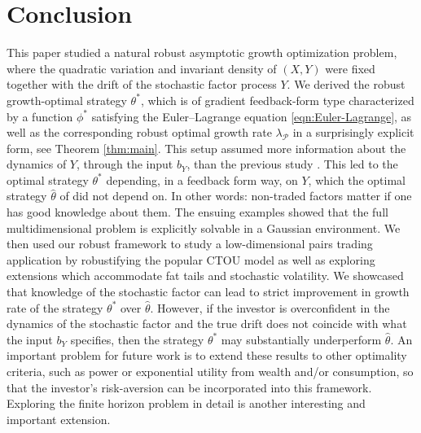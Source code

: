 \documentclass{article}
\theoremstyle{plain}
\theoremstyle{definition}
\newcommand{\Pcal}{{\mathcal P}}
\numberwithin{lem}{section}
\begin{document}
\section{Conclusion}
\label{sec:conclusion}
This paper studied a natural robust asymptotic growth optimization problem, where the quadratic variation and invariant density of $(X,Y)$ were fixed together with the drift of the stochastic factor process $Y$. We derived the robust growth-optimal strategy $\theta^*$, which is of gradient feedback-form type characterized by a function $\phi^*$ satisfying the Euler--Lagrange equation \eqref{eqn:Euler-Lagrange}, as well as the corresponding robust optimal growth rate $\lambda_{\Pcal}$ in a surprisingly explicit form, see Theorem \ref{thm:main}. This setup assumed more information about the dynamics of $Y$, through the input $b_Y$, than the previous study \cite{itkin2025ergodic}. This led to the optimal strategy $\theta^*$ depending, in a feedback form way, on $Y$, which the optimal strategy $\widehat \theta$ of \cite{itkin2025ergodic} did not depend on. In other words: non-traded factors matter if one has good knowledge about them.  
The ensuing examples showed that the full multidimensional problem is explicitly solvable in a Gaussian environment. We then used our robust framework to study a low-dimensional pairs trading application by robustifying the popular CTOU model as well as exploring extensions which accommodate fat tails and stochastic volatility. We showcased that knowledge of the stochastic factor can lead to strict improvement in growth rate of the strategy $\theta^*$ over $\widehat \theta$. However, if the investor is overconfident in the dynamics of the stochastic factor and the true drift does not coincide with what the input $b_Y$ specifies, then the strategy $\theta^*$ may substantially underperform $\widehat \theta$. An important problem for future work is to extend these results to other optimality criteria, such as power or exponential utility from wealth and/or consumption, so that the investor's risk-aversion can be incorporated into this framework. Exploring the finite horizon problem in detail is another interesting and important extension. 
   
\end{document}
